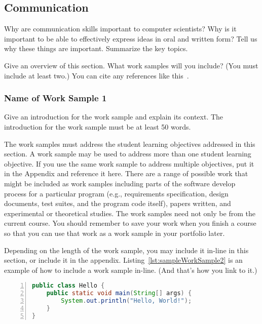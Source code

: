 \subsection{Communication}
Why are communication skills important to computer scientists?  Why is it
important to be able to effectively express ideas in oral and written form?
Tell us why these things are important.  Summarize the key topics.

Give an overview of this section.  What work samples will you include?
(You must include at least two.)  You can cite any references like
this~\cite{parks:samsfsoal:2009}.

\subsubsection{Name of Work Sample 1}
Give an introduction for the work sample and explain its context.  The
introduction for the work sample must be at least 50 words.

The work samples must address the student learning objectives addressed in
this section.  A work sample may be used to address more than one student
learning objective.  If you use the same work sample to address multiple
objectives, put it in the Appendix and reference it here.
There are a range of possible work that might be
included as work samples including parts of the software develop process
for a particular program (e.g., requirements specification, design documents,
test suites, and the program code itself), papers written, and
experimental or theoretical studies.  The work samples need not only
be from the current course.  You should remember to save your work when
you finish a course so that you can use that work as a work sample in
your portfolio later.

Depending on the length of the work sample, you may include it in-line in
this section, or include it in the appendix.  Listing~\ref{lst:sampleWorkSample2}
is an example of how to include a work sample in-line. (And that's how you
link to it.)

\begin{singlespace}
\begin{lstlisting}[float,
                   escapeinside='',
                   basicstyle=\ttfamily\footnotesize,
                   emphstyle=\textbf,
                   numberstyle=\tiny,
                   xleftmargin=.3cm,
                   language=java,
                   numbers=left,
                   numbersep=5pt,
                   firstnumber=auto,
                   stepnumber=1,
                   numberblanklines=true,
                   showspaces=false,
                   showstringspaces=false,
                   showtabs=false,
                   captionpos=b,
                   caption=Sample Java Source File,
                   label=lst:sampleWorkSample2]
public class Hello {
    public static void main(String[] args) {
        System.out.println("Hello, World!");
    }
}
\end{lstlisting}
\end{singlespace}

